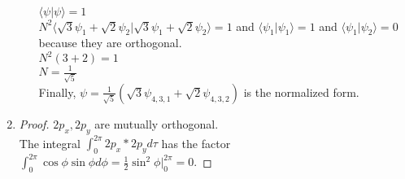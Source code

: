 \documentclass{article}
\begin{document}
\begin{enumerate}
\begin{enumerate}
        \\ $\langle \psi|\psi\rangle=1$
        \\ $N^2\Big\langle \sqrt{3}\psi_1+\sqrt{2}\psi_2\Big|\sqrt{3}\psi_1+\sqrt{2}\psi_{2}\Big\rangle=1$ and $\langle \psi_1|\psi_1\rangle=1$ and $\langle\psi_1|\psi_2\rangle=0$ because they are orthogonal.
        \\ $N^2(3+2)=1$
        \\ $N=\frac{1}{\sqrt{5}}$
        \\ Finally, $\psi=\frac{1}{\sqrt{5}}\left(\sqrt{3}\psi_{4,3,1}+\sqrt{2}\psi_{4,3,2}\right)$ is the normalized form.
    \end{enumerate}
\item \begin{proof} $2p_x,2p_y$ are mutually orthogonal.
\\ The integral $\int_0^{2\pi} 2p_x*2p_yd\tau$ has the factor $\int_0^{2\pi}\cos{\phi}\sin{\phi}d\phi=\frac{1}{2}\sin^2\phi\Big|_0^{2\pi}=0.$
\end{proof}


\end{enumerate}
\end{document}
